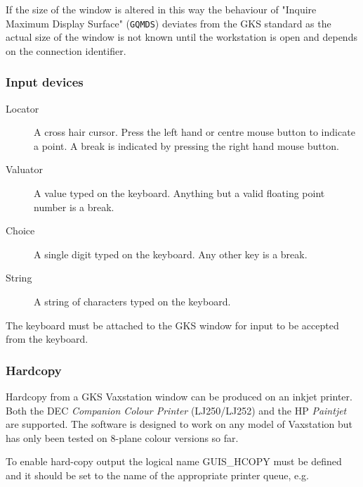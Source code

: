 If the size of the window is altered in this way the behaviour of "Inquire
Maximum Display Surface" ({\tt GQMDS}) deviates from the GKS standard as
the actual size of the window is not known until the workstation is open and
depends on the connection identifier.

\subsubsection{Input devices}
\begin{description}
\item[Locator] A cross hair cursor.
Press the left hand or centre mouse button to indicate a point. A break is
indicated by pressing the right hand mouse button.
\item[Valuator] A value typed on the keyboard.
Anything but a valid floating point number is a break.
\item[Choice] A single digit typed on the keyboard.
Any other key is a break.
\item[String] A string of characters typed on the keyboard.
\end{description}
The keyboard must be attached to the GKS window for input to be accepted from
the keyboard.

\subsubsection{Hardcopy}

Hardcopy from a GKS Vaxstation window can be produced on an inkjet
printer.  Both the DEC {\it Companion Colour Printer} (LJ250/LJ252) and
the HP {\it Paintjet} are supported. The software is designed to work on 
any model of Vaxstation but has only been tested 
on 8-plane colour versions so far. 

To enable hard-copy output the logical name GUIS\_HCOPY must be defined
and it should be set to the name of the appropriate printer queue, e.g. 

